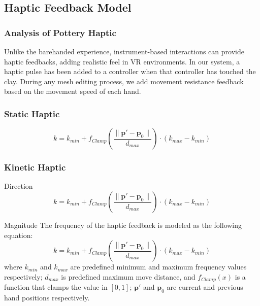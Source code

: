 \documentclass{svjour3}                     %
\begin{document}
\subsection{Haptic Feedback Model}

\subsubsection{Analysis of Pottery Haptic}
Unlike the barehanded experience, instrument-based interactions can provide haptic feedbacks, adding realistic feel in VR environments. In our system, a haptic pulse has been added to a controller when that controller has touched the clay. During any mesh editing process, we add movement resistance feedback based on the movement speed of each hand.

\subsubsection{Static Haptic}



\begin{equation}
k = k_{min} + f_{Clamp}(\frac{ \| \mathbf{p'} - \mathbf{p}_{0} \|}{d_{max}}) \cdot (k_{max} - k_{min})
\end{equation}



\subsubsection{Kinetic Haptic}

Direction
\begin{equation}
k = k_{min} + f_{Clamp}(\frac{ \| \mathbf{p'} - \mathbf{p}_{0} \|}{d_{max}}) \cdot (k_{max} - k_{min})
\end{equation}

Magnitude
The frequency of the haptic feedback is modeled as the following equation:
\begin{equation}
k = k_{min} + f_{Clamp}(\frac{ \| \mathbf{p'} - \mathbf{p}_{0} \|}{d_{max}}) \cdot (k_{max} - k_{min})
\end{equation}
where $k_{min}$ and $k_{max}$ are predefined minimum and maximum frequency values respectively; $d_{max}$ is predefined maximum move distance, and $f_{Clamp}(x)$ is a function that clamps the value in $[0,1]$; $\mathbf{p'}$ and $\mathbf{p}_{0}$ are current and previous hand positions respectively.
\end{document}
